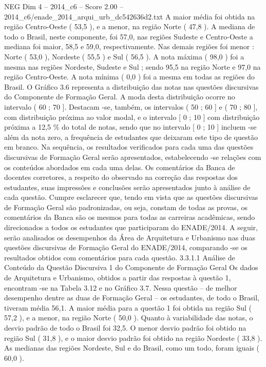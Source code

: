 \begin{textsample}{NEG Dim 4 – 2014\_c6 – Score 2.00 – 2014\_c6/enade\_2014\_arqui\_urb\_dc542636d2.txt}
A maior média foi obtida na região Centro-Oeste ( 53,5 ), e a menor, na região Norte ( 47,8 ).
A mediana de todo o Brasil, neste componente, foi 57,0, nas regiões Sudeste e Centro-Oeste a mediana foi maior, 58,5 e 59,0, respectivamente.
Nas demais regiões foi menor : Norte ( 53,0 ), Nordeste ( 55,5 ) e Sul ( 56,5 ).
A nota máxima ( 98,0 ) foi a mesma nas regiões Nordeste, Sudeste e Sul ; sendo 95,5 na região Norte e 97,0 na região Centro-Oeste.
A nota mínima ( 0,0 ) foi a mesma em todas as regiões do Brasil.
O Gráfico 3.6 representa a distribuição das notas nas questões discursivas do Componente de Formação Geral.
A moda desta distribuição ocorre no intervalo ( 60 ; 70 ].
Destacam -se, também, os intervalos ( 50 ; 60 ] e ( 70 ; 80 ], com distribuição próxima ao valor modal, e o intervalo [ 0 ; 10 ] com distribuição próxima a 12,5 \% do total de notas, sendo que no intervalo [ 0 ; 10 ] incluem -se além da nota zero, a frequência de estudantes que deixaram este tipo de questão em branco.
Na sequência, os resultados verificados para cada uma das questões discursivas de Formação Geral serão apresentados, estabelecendo -se relações com os conteúdos abordados em cada uma delas.
Os comentários da Banca de docentes corretores, a respeito do observado na correção das respostas dos estudantes, suas impressões e conclusões serão apresentados junto à análise de cada questão.
Cumpre esclarecer que, tendo em vista que as questões discursivas de Formação Geral são padronizadas, ou seja, constam de todas as provas, os comentários da Banca são os mesmos para todas as carreiras acadêmicas, sendo direcionados a todos os estudantes que participaram do ENADE/2014.
A seguir, serão analisados os desempenhos da Área de Arquitetura e Urbanismo nas duas questões discursivas de Formação Geral do ENADE/2014, comparando -se os resultados obtidos com comentários para cada questão. 3.3.1.1 Análise de Conteúdo da Questão Discursiva 1 do Componente de Formação Geral Os dados de Arquitetura e Urbanismo, obtidos a partir das respostas à questão 1, encontram -se na Tabela 3.12 e no Gráfico 3.7.
Nessa questão – de melhor desempenho dentre as duas de Formação Geral – os estudantes, de todo o Brasil, tiveram média 56,1.
A maior média para a questão 1 foi obtida na região Sul ( 57,2 ), e a menor, na região Norte ( 50,0 ).
Quanto à variabilidade das notas, o desvio padrão de todo o Brasil foi 32,5.
O menor desvio padrão foi obtido na região Sul ( 31,8 ), e o maior desvio padrão foi obtido na região Nordeste ( 33,8 ).
As medianas das regiões Nordeste, Sul e do Brasil, como um todo, foram iguais ( 60,0 ).

\end{textsample}
